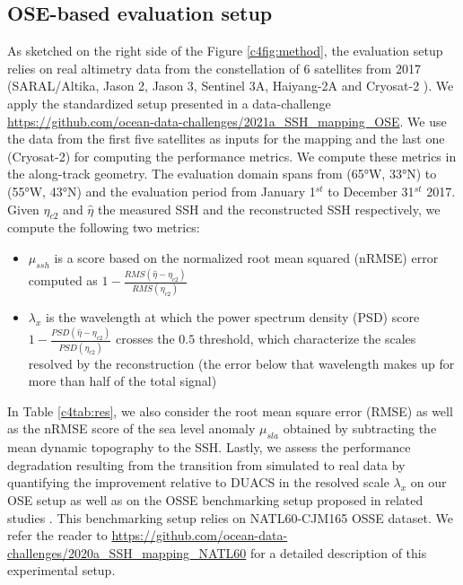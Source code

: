 \begin{bibunit}
\subsection{OSE-based evaluation setup}
\label{c4ssec:eval}
As sketched on the right side of the Figure \ref{c4fig:method},
the evaluation setup relies on real altimetry data from the constellation of 6 satellites from 2017 (SARAL/Altika, Jason 2, Jason 3, Sentinel 3A, Haiyang-2A and Cryosat-2 ).
We apply the standardized setup presented in a data-challenge \url{https://github.com/ocean-data-challenges/2021a_SSH_mapping_OSE}.
We use the data from the first five satellites as inputs for the mapping and the last one (Cryosat-2) for computing the performance metrics. We compute these metrics in the along-track geometry. %
The evaluation domain spans from (65°W, 33°N) to (55°W, 43°N)  and the evaluation period from January 1$^{st}$ to December 31$^{st}$ 2017.  Given $\eta_{c2}$ and $\hat{\eta}$ the measured SSH and the reconstructed SSH respectively, we compute the following two metrics:
\begin{itemize}
    \item $\mu_{ssh}$ is a score based on the normalized root mean squared (nRMSE) error  computed as $1 - \displaystyle\frac{RMS(\hat{\eta} - \eta_{c2})}{RMS(\eta_{c2})}$
    \item $\lambda_x$ is the wavelength at which the power spectrum density (PSD) score  $1 - \displaystyle \frac{PSD(\hat{\eta} - \eta_{c2})}{PSD(\eta_{c2})}$ crosses the $0.5$ threshold, which characterize the scales resolved by the reconstruction (the error below that wavelength makes up for more than half of the total signal)
\end{itemize}

In Table \ref{c4tab:res}, we also consider the root mean square error (RMSE) as well as the nRMSE score of the sea level anomaly $\mu_{sla}$ obtained by subtracting the mean dynamic topography to the SSH. Lastly, we assess the performance degradation resulting from the transition from simulated to real data by quantifying the improvement relative to DUACS in the resolved scale $\lambda_x$ on our OSE setup as well as on
the OSSE benchmarking setup proposed in related studies \cite{guillouMappingAltimetryForthcoming2021}. This benchmarking setup relies on NATL60-CJM165 OSSE dataset. We refer the reader to \url{https://github.com/ocean-data-challenges/2020a_SSH_mapping\_NATL60} for a detailed description of this experimental setup.





\end{bibunit}

